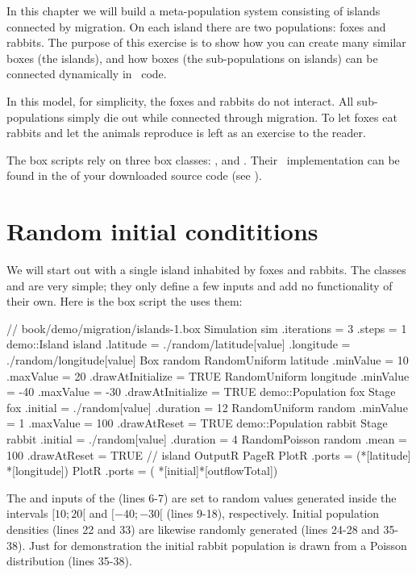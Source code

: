 In this chapter we will build a meta-population system consisting of islands connected by migration. On each island there are two populations: foxes and rabbits. The purpose of this exercise is to show how you can create many similar boxes (the islands), and how boxes (the sub-populations on islands) can be connected dynamically in \CPP\ code.

In this model, for simplicity, the foxes and rabbits do not interact. All sub-populations simply die out while connected through migration. To let foxes eat rabbits and let the animals reproduce is left as an exercise to the reader.

The box scripts rely on three box classes: ,  and . Their \CPP\ implementation can be found in the  of your downloaded source code (see ).

\section {Random initial condititions}
We will start out with a single island inhabited by foxes and rabbits. The classes  and  are very simple; they only define a few inputs and add no functionality of their own. Here is the box script the uses them:
\lstset{numbers=left}
\begin{boxscript}
// book/demo/migration/islands-1.box
Simulation sim {
	.iterations = 3
	.steps = 1
	demo::Island island {
		.latitude = ./random/latitude[value]
		.longitude = ./random/longitude[value]
		Box random {
			RandomUniform latitude {
				.minValue = 10
				.maxValue = 20 
				.drawAtInitialize = TRUE
			}
			RandomUniform longitude {
				.minValue = -40
				.maxValue = -30
				.drawAtInitialize = TRUE
			}
		}
		demo::Population fox {
			Stage fox {
				.initial = ./random[value]
				.duration = 12
				RandomUniform random {
					.minValue = 1
					.maxValue = 100 
					.drawAtReset = TRUE
				}
			}
		}
		demo::Population rabbit {
			Stage rabbit {
				.initial = ./random[value]
				.duration = 4
				RandomPoisson random {
					.mean = 100
					.drawAtReset = TRUE
				}
			}
		} 
	} // island
	OutputR {
		PageR {
			PlotR {
				.ports = (*[latitude] *[longitude])
			}
			PlotR {
				.ports = ( *[initial]*[outflowTotal])
			}
		}
	}
}
\end{boxscript}
\lstset{numbers=none}

The  and  inputs of the  (lines 6-7) are set to random values generated inside the intervals $[10;20[$ and $[-40;-30[$ (lines 9-18), respectively. Initial population densities (lines 22 and 33) are likewise randomly generated (lines 24-28 and 35-38). Just for demonstration the initial rabbit population is drawn from a Poisson distribution (lines 35-38).

